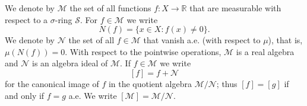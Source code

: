We denote by $\mathcal{M}$ the set of all functions $f: X \to \mathbb{R}$ that are measurable with respect to a $\sigma$-ring $\mathcal{S}$. For $f \in \mathcal{M}$ we write
$$N(f) = \{x \in X : f(x) \neq 0\}.$$
We denote by $\mathcal{N}$ the set of all $f \in \mathcal{M}$ that vanish a.e. (with respect to $\mu$), that is, $\mu(N(f)) = 0$. With respect to the pointwise operations, $\mathcal{M}$ is a real algebra and $\mathcal{N}$ is an algebra ideal of $\mathcal{M}$. If $f \in \mathcal{M}$ we write
$$[f] = f + \mathcal{N}$$
for the canonical image of $f$ in the quotient algebra $\mathcal{M}/\mathcal{N}$; thus $[f] = [g]$ if and only if $f = g$ a.e. We write $[\mathcal{M}] = \mathcal{M}/\mathcal{N}$.
